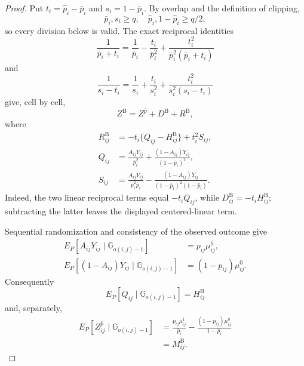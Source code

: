 \documentclass{article}
\begin{document}
\begin{proof}
Put \(t_i=\widehat p_i-\bar p_i\) and \(s_i=1-\bar p_i\).  By overlap and the definition of clipping,
\[
 \bar p_i,s_i\ge q,
 \quad
 \widehat p_i,1-\widehat p_i\ge q/2,
\]
so every division below is valid.  The exact reciprocal identities
\[
 \frac1{\bar p_i+t_i}
 =\frac1{\bar p_i}-\frac{t_i}{\bar p_i^2}
 +\frac{t_i^2}{\bar p_i^2(\bar p_i+t_i)}
\]
and
\[
 \frac1{s_i-t_i}
 =\frac1{s_i}+\frac{t_i}{s_i^2}
 +\frac{t_i^2}{s_i^2(s_i-t_i)}
\]
give, cell by cell,
\[
 Z^{\mathrm B}=Z^{\bar p}+D^{\mathrm B}+R^{\mathrm B},
\]
where
\[
 \begin{aligned}
 R^{\mathrm B}_{ij}
 &=-t_i\{Q_{ij}-H^{\mathrm B}_{ij}\}+t_i^2S_{ij},\\
 Q_{ij}
 &=\frac{A_{ij}Y_{ij}}{\bar p_i^2}
   +\frac{(1-A_{ij})Y_{ij}}{(1-\bar p_i)^2},\\
 S_{ij}
 &=\frac{A_{ij}Y_{ij}}{\bar p_i^2\widehat p_i}
   -\frac{(1-A_{ij})Y_{ij}}
   {(1-\bar p_i)^2(1-\widehat p_i)}.
 \end{aligned}
\]
Indeed, the two linear reciprocal terms equal \(-t_iQ_{ij}\), while \(D^{\mathrm B}_{ij}=-t_iH^{\mathrm B}_{ij}\); subtracting the latter leaves the displayed centered-linear term.

Sequential randomization and consistency of the observed outcome give
\[
 \begin{aligned}
 E_P[A_{ij}Y_{ij}\mid\mathbb G_{o(i,j)-1}]
 &=p_{ij}\mu^1_{ij},\\
 E_P[(1-A_{ij})Y_{ij}\mid\mathbb G_{o(i,j)-1}]
 &=(1-p_{ij})\mu^0_{ij}.
 \end{aligned}
\]
Consequently
\[
 E_P[Q_{ij}\mid\mathbb G_{o(i,j)-1}]=H^{\mathrm B}_{ij}
\]
and, separately,
\[
 \begin{aligned}
 E_P[Z^{\bar p}_{ij}\mid\mathbb G_{o(i,j)-1}]
 &=\frac{p_{ij}\mu^1_{ij}}{\bar p_i}
   -\frac{(1-p_{ij})\mu^0_{ij}}{1-\bar p_i}\\
 &=M^{\mathrm B}_{ij}.
 \end{aligned}
\]


\end{proof}
\end{document}
